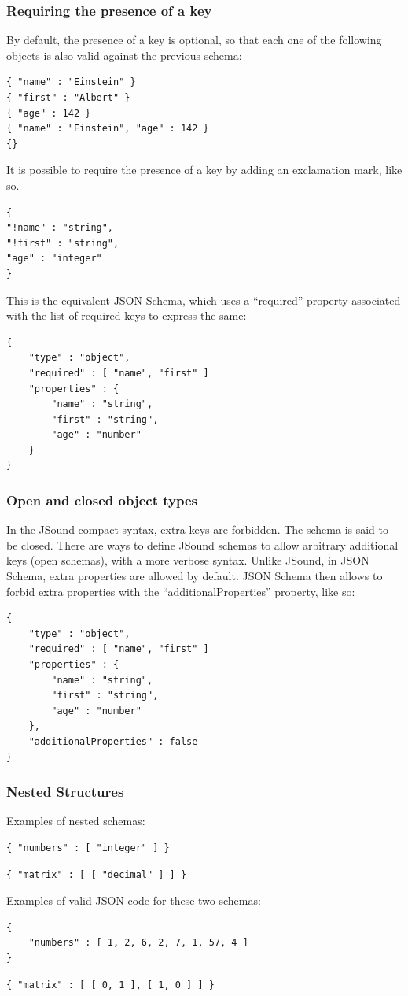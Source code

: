 \subsubsection{Requiring the presence of a key}
By default, the presence of a key is optional, so that each one of the following objects is also valid against the previous schema:
\begin{lstlisting}[style=json]
{ "name" : "Einstein" }
{ "first" : "Albert" }
{ "age" : 142 }
{ "name" : "Einstein", "age" : 142 }
{}
\end{lstlisting}
It is possible to require the presence of a key by adding an exclamation mark, like so.
\begin{lstlisting}[style=json]
{
"!name" : "string",
"!first" : "string",
"age" : "integer"
}
\end{lstlisting}
This is the equivalent JSON Schema, which uses a “required” property associated with the list of required keys to express the same:
\begin{lstlisting}[style=json]
{
    "type" : "object",
    "required" : [ "name", "first" ]
    "properties" : {
        "name" : "string",
        "first" : "string",
        "age" : "number"
    }
}
\end{lstlisting}

\subsubsection{Open and closed object types}
In the JSound compact syntax, extra keys are forbidden. The schema is said to be closed. There are ways to define JSound schemas to allow arbitrary additional keys (open schemas), with a more verbose syntax. Unlike JSound, in JSON Schema, extra properties are allowed by default. JSON Schema then allows to forbid extra properties with the “additionalProperties” property, like so:
\begin{lstlisting}[style=json]
{
    "type" : "object",
    "required" : [ "name", "first" ]
    "properties" : {
        "name" : "string",
        "first" : "string",
        "age" : "number"
    },
    "additionalProperties" : false
}
\end{lstlisting}

\subsubsection{Nested Structures}
Examples of nested schemas:
\begin{lstlisting}[style=json]
{ "numbers" : [ "integer" ] }
\end{lstlisting}
\begin{lstlisting}[style=json]
{ "matrix" : [ [ "decimal" ] ] }
\end{lstlisting}
Examples of valid JSON code for these two schemas:
\begin{lstlisting}[style=json]
{
    "numbers" : [ 1, 2, 6, 2, 7, 1, 57, 4 ]
}
\end{lstlisting}
\begin{lstlisting}[style=json]
{ "matrix" : [ [ 0, 1 ], [ 1, 0 ] ] }
\end{lstlisting}

